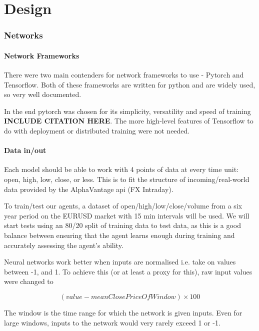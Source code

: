 \newpage
\part{Design}

    \graphicspath{{images/design/}}


    \section{Networks}
        
        \subsection{Network Frameworks}
        There were two main contenders for network frameworks to use - Pytorch and Tensorflow. Both of these frameworks are written for python and are widely used, so very well documented.

        In the end pytorch was chosen for its simplicity, versatility and speed of training \textbf{INCLUDE CITATION HERE}. The more high-level features of Tensorflow to do with deployment or distributed training were not needed. 


        \subsection{Data in/out}

        Each model should be able to work with 4 points of data at every time unit: open, high, low, close, or less. This is to fit the structure of incoming/real-world data provided by the AlphaVantage api (FX Intraday). 

        To train/test our agents, a dataset of open/high/low/close/volume from a six year period on the EURUSD market with 15 min intervals will be used. We will start tests using an 80/20 split of training data to test data, as this is a good balance between ensuring that the agent learns enough during training and accurately assessing the agent's ability. 

        Neural networks work better when inputs are normalised i.e. take on values between -1, and 1. To achieve this (or at least a proxy for this), raw input values were changed to 
        
        \begin{equation}
        (value - meanClosePriceOfWindow) \times 100
        \end{equation}

        The window is the time range for which the network is given inputs. Even for large windows, inputs to the network would very rarely exceed 1 or -1.

